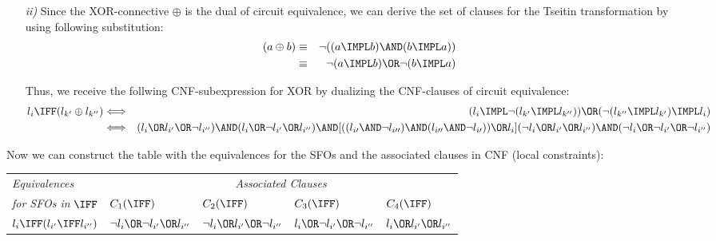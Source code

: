 {\begin{enumerate}
	\item[\textit{ii)}] Since the \textrm{XOR}-connective $\oplus $ is the dual
	of circuit equivalence, we can derive the set of clauses for the Tseitin
	transformation by using following substitution:%
	\begin{eqnarray*}
	(a\oplus b) &\equiv &\lnot ((a\IMPL b)\AND(b\IMPL a)) \\
	&\equiv &\lnot (a\IMPL b)\OR\lnot (b\IMPL a)
	\end{eqnarray*}

	Thus, we receive the follwing CNF-subexpression for \textrm{XOR} by
	dualizing the CNF-clauses of circuit equivalence:%
	\begin{eqnarray*}
	l_{i}\IFF(l_{k^{\prime }}\oplus l_{k^{\prime \prime }}) &\Longleftrightarrow
	&(l_{i}\IMPL\lnot (l_{k^{\prime }}\IMPL l_{k^{\prime \prime }}))\OR(\lnot
	(l_{k^{\prime \prime }}\IMPL l_{k^{\prime }})\IMPL l_{i}) \\
	&\Longleftrightarrow &(l_{i}\OR l_{i^{\prime }}\OR\lnot l_{i^{\prime \prime
	}})\AND(l_{i}\OR\lnot l_{i^{\prime }}\OR l_{i^{\prime \prime }})\AND
	[((l_{i\prime} \AND\neg l_{i\prime\prime}) \AND (l_{i\prime\prime} \AND\neg
	l_{i\prime})) \OR l_{i}](\lnot l_{i}\OR l_{i^{\prime }}\OR l_{i^{\prime
	\prime }})\AND(\lnot l_{i}\OR\lnot l_{i^{\prime }}\OR\lnot l_{i^{\prime
	\prime }})
	\end{eqnarray*}
	\end{enumerate}

	Now we can construct the table with the equivalences for the SFOs and the
	associated clauses in CNF (local constraints):

	\begin{tabular}{|l|l|l|l|l|}
	\hline
	\textsl{\small Equivalences} & \multicolumn{4}{c|}{\textsl{\small Associated
	Clauses}} \\ 
	{\small \textsl{for SFOs in} $\IFF$} & $C_{1}(\IFF)$ & $C_{2}(\IFF)$ & $%
	C_{3}(\IFF)$ & $C_{4}(\IFF)$ \\ \hline
	$l_{i}\IFF(l_{i^{\prime }}\IFF l_{i^{\prime \prime }})$ & $\lnot l_{i}\OR%
	\lnot l_{i^{\prime }}\OR l_{i^{\prime \prime }}$ & $\lnot l_{i}\OR %
	l_{i^{\prime }}\OR\lnot l_{i^{\prime \prime }}$ & $l_{i}\OR\lnot
	l_{i^{\prime }}\OR\lnot l_{i^{\prime \prime }}$ & $l_{i}\OR l_{i^{\prime }}%
	\OR l_{i^{\prime \prime }}$ \\ \hline
	\end{tabular}
	\label{tab:translation_cnf}

	\bigskip
}
